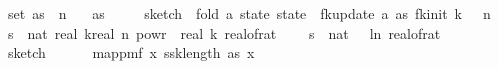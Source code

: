 \begin{isabellebody}
\ \ \ {\isachardoublequoteopen}set\ as\ {\isasymsubseteq}\ {\isacharbraceleft}{\kern0pt}{}{\isachardot}{\kern0pt}{\isachardot}{\kern0pt}{\isacharless}{\kern0pt}n{\isacharbraceright}{\kern0pt}{\isachardoublequoteclose}\isanewline
\ \ \ {\isachardoublequoteopen}as\ {\isasymnoteq}\ {\isacharbrackleft}{\kern0pt}{\isacharbrackright}{\kern0pt}{\isachardoublequoteclose}\isanewline
\ \ \ {\isachardoublequoteopen}sketch\ {\isasymequiv}\ fold\ {\isacharparenleft}{\kern0pt}{\isasymlambda}a\ state{\isachardot}{\kern0pt}\ state\ {\isasymbind}\ fk{\isacharunderscore}{\kern0pt}update\ a{\isacharparenright}{\kern0pt}\ as\ {\isacharparenleft}{\kern0pt}fk{\isacharunderscore}{\kern0pt}init\ k\ {\isasymdelta}\ {\isasymepsilon}\ n{\isacharparenright}{\kern0pt}{\isachardoublequoteclose}\isanewline
\ \ \ {\isachardoublequoteopen}s\ {\isasymequiv}\ nat\ {\isasymlceil}{}{\isacharasterisk}{\kern0pt}real\ k{\isacharasterisk}{\kern0pt}{\isacharparenleft}{\kern0pt}real\ n{\isacharparenright}{\kern0pt}\ powr\ {\isacharparenleft}{\kern0pt}{}{\isacharminus}{\kern0pt}{}{\isacharslash}{\kern0pt}\ real\ k{\isacharparenright}{\kern0pt}{\isacharslash}{\kern0pt}\ {\isacharparenleft}{\kern0pt}real{\isacharunderscore}{\kern0pt}of{\isacharunderscore}{\kern0pt}rat\ {\isasymdelta}{\isacharparenright}{\kern0pt}\isanewline
\ \ \ {\isachardoublequoteopen}s\ {\isasymequiv}\ nat\ {\isasymlceil}{\isacharminus}{\kern0pt}{\isacharparenleft}{\kern0pt}{}{}\ {\isacharasterisk}{\kern0pt}\ ln\ {\isacharparenleft}{\kern0pt}real{\isacharunderscore}{\kern0pt}of{\isacharunderscore}{\kern0pt}rat\ {\isasymepsilon}{\isacharparenright}{\kern0pt}{\isacharparenright}{\kern0pt}{\isasymrceil}{\isachardoublequoteclose}\isanewline
\ \ \ {\isachardoublequoteopen}sketch\ {\isacharequal}{\kern0pt}\ \isanewline
\ \ \ \ map{\isacharunderscore}{\kern0pt}pmf\ {\isacharparenleft}{\kern0pt}{\isasymlambda}x{\isachardot}{\kern0pt}\ {\isacharparenleft}{\kern0pt}ssk{\isacharcomma}{\kern0pt}length\ as{\isacharcomma}{\kern0pt}\ x{\isacharparenright}{\kern0pt}{\isacharparenright}{\kern0pt}\ \isanewline

\end{isabellebody}
